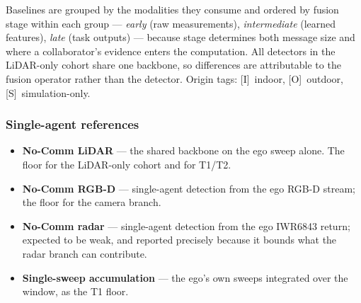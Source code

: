 Baselines are grouped by the modalities they consume and ordered by fusion
stage within each group --- \emph{early} (raw measurements), \emph{intermediate}
(learned features), \emph{late} (task outputs) --- because stage determines both
message size and where a collaborator's evidence enters the computation. All
detectors in the LiDAR-only cohort share one backbone, so differences are
attributable to the fusion operator rather than the detector. Origin tags:
[I]~indoor, [O]~outdoor, [S]~simulation-only.

\subsubsection{Single-agent references}
\label{sec:bench:solo}
\begin{itemize}
  \item \textbf{No-Comm LiDAR} --- the shared backbone on the ego sweep alone.
        The floor for the LiDAR-only cohort and for T1/T2.
  \item \textbf{No-Comm RGB-D} --- single-agent detection from the ego RGB-D
        stream; the floor for the camera branch.
  \item \textbf{No-Comm radar} --- single-agent detection from the ego IWR6843
        return; expected to be weak, and reported precisely because it bounds
        what the radar branch can contribute.
  \item \textbf{Single-sweep accumulation} --- the ego's own sweeps integrated
        over the window, as the T1 floor.
\end{itemize}

